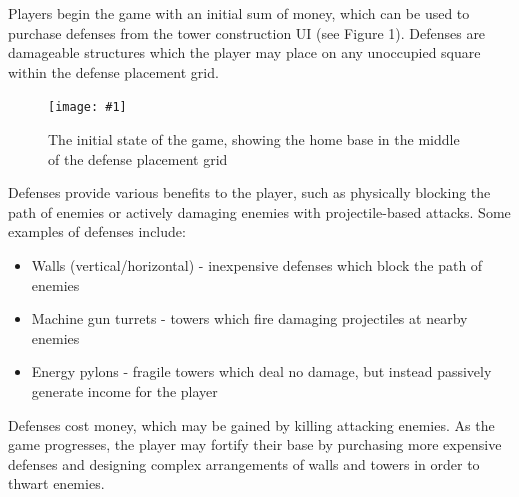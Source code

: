 \documentclass[letterpaper]{article}
\def\imfig#1#2{\begin{figure}[h] \centering \texttt{[image: \#1]} \caption{#2} \end{figure}}
\begin{document}
Players begin the game with an initial sum of money, which can be used to purchase defenses from the tower construction UI (see Figure 1). Defenses are damageable structures which the player may place on any unoccupied square within the defense placement grid.
\imfig{ZoomedOut}{The initial state of the game, showing the home base in the middle of the defense placement grid}

Defenses provide various benefits to the player, such as physically blocking the path of enemies or actively damaging enemies with projectile-based attacks. Some examples of defenses include:
\begin{itemize}
	\item Walls (vertical/horizontal) - inexpensive defenses which block the path of enemies
	\item Machine gun turrets - towers which fire damaging projectiles at nearby enemies
	\item Energy pylons - fragile towers which deal no damage, but instead passively generate income for the player
\end{itemize}

Defenses cost money, which may be gained by killing attacking enemies. As the game progresses, the player may fortify their base by purchasing more expensive defenses and designing complex arrangements of walls and towers in order to thwart enemies.

\pagebreak
\end{document}
